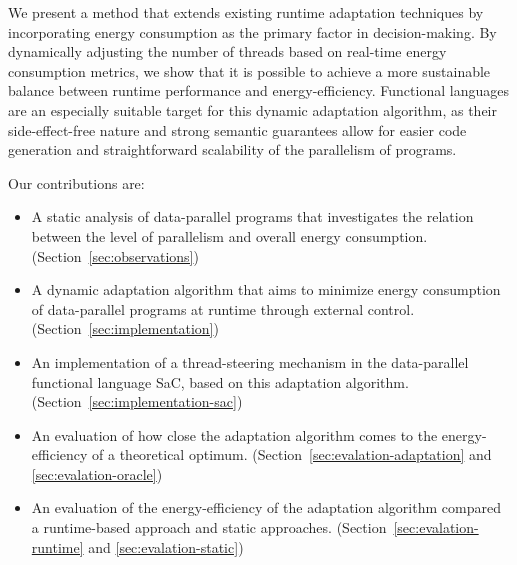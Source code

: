 We present a method that extends existing runtime adaptation techniques by incorporating energy
consumption as the primary factor in decision-making. By dynamically adjusting the number of threads
based on real-time energy consumption metrics, we show that it is possible to achieve a more
sustainable balance between runtime performance and energy-efficiency. Functional languages are an
especially suitable target for this dynamic adaptation algorithm, as their side-effect-free nature
and strong semantic guarantees allow for easier code generation and straightforward scalability of
the parallelism of programs.

Our contributions are:
\begin{itemize}
    \item A static analysis of data-parallel programs that investigates the relation between the
    level of parallelism and overall energy consumption. (Section~\ref{sec:observations})
    \item A dynamic adaptation algorithm that aims to minimize energy consumption of data-parallel
    programs at runtime through external control. (Section~\ref{sec:implementation})
    \item An implementation of a thread-steering mechanism in the data-parallel functional language
    SaC, based on this adaptation algorithm. (Section~\ref{sec:implementation-sac})
    \item An evaluation of how close the adaptation algorithm comes to the energy-efficiency of a
    theoretical optimum. (Section~\ref{sec:evalation-adaptation} and \ref{sec:evalation-oracle})
    \item An evaluation of the energy-efficiency of the adaptation algorithm compared a
    runtime-based approach and static approaches. (Section~\ref{sec:evalation-runtime} and
    \ref{sec:evalation-static})
\end{itemize}
